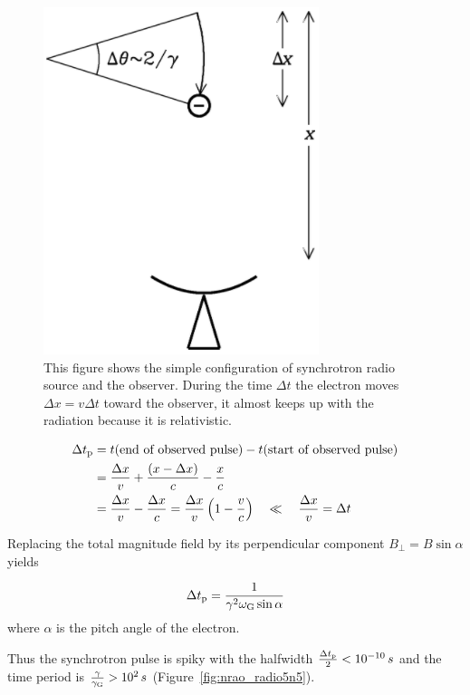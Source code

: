\begin{figure}[htbp]
	\centering
	\includegraphics[width=.3\linewidth]{Chapter_2/Figures/NRAO_radio5n4.png}
    \caption[Simple condiguration of the synchrotron source and observer]{\label{fig:nrao_radio5n4}
        This figure shows the simple configuration of synchrotron radio source and the observer.
        During the time $\Delta t$ the electron moves $\Delta x = v\Delta t$ toward the observer, it almost keeps up with the radiation because it is relativistic.
    }
\end{figure}

\begin{equation}\label{eq:essential_radio5n54}
    \begin{aligned}
        \Delta t_{\mathrm{p}} &=t(\text{end of observed pulse})-t(\text{start of observed pulse}) \\
                              &=\frac{\Delta x}{v}+\frac{(x-\Delta x)}{c}-\frac{x}{c} \\
                              &= \frac{\Delta x}{v}-\frac{\Delta x}{c}=\frac{\Delta x}{v}\left(1-\frac{v}{c}\right) \quad \ll \quad \frac{\Delta x}{v}=\Delta t
    \end{aligned}
\end{equation}

Replacing the total magnitude field by its perpendicular component $B_{\perp} = B\sin\alpha$ yields

\begin{equation}\label{eq:essential_radio5n60}
    \Delta t_{\mathrm{p}} = \frac{1}{\gamma^2 \omega_{\mathrm{G}} \sin \alpha}
\end{equation}
where $\alpha$ is the pitch angle of the electron.

Thus the synchrotron pulse is spiky with the halfwidth $\frac{\Delta t_{\mathrm{p}}}{2} < 10^{-10}\,s$ and the time period is $\frac{\gamma}{\gamma_{\mathrm{G}}} > 10^2\,s$ (Figure~\ref{fig:nrao_radio5n5}).

